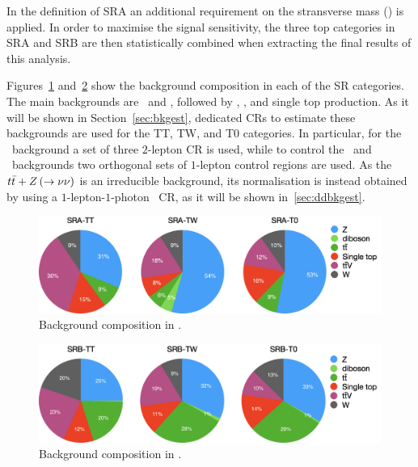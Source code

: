 				In the definition of SRA an additional requirement on the stransverse mass (\mttwo) is applied. In order to maximise the signal sensitivity, the three top categories in SRA and SRB are then statistically combined when extracting the final results of this analysis. 

				Figures~\ref{fig:SRA_bkgcomp} and~\ref{fig:SRB_bkgcomp} show the background composition in each of the SR categories. The main backgrounds are \Zjets\ and \ttV, followed by \ttbar, \Wjets, and single top production. As it will be shown in Section~\ref{sec:bkgest}, dedicated \acp{CR} to estimate these backgrounds are used for the TT, TW, and T0 categories. In particular, for the \Zjets\ background a set of three $2$-lepton \ac{CR} is used, while to control the \ttbar\ and \Wjets\ backgrounds two orthogonal sets of $1$-lepton control regions are used. As the $t\bar{t}+Z \left ( \rightarrow \nu\nu\right)$ is an irreducible background, its normalisation is instead obtained by using a $1$-lepton-$1$-photon \ttgamma\ \ac{CR}, as it will be shown in~\ref{sec:ddbkgest}.

				\begin{figure}[t]
				  \begin{center}
				   \includegraphics[width=\textwidth]{figures/stop/piechart_SRAcomp}
				   \caption{Background composition in \SRA.}
				   \label{fig:SRA_bkgcomp}
				  \end{center}
				\end{figure}


				\begin{figure}[t]
				  \begin{center}
				   \includegraphics[width=\textwidth]{figures/stop/piechart_SRBcomp}
				   \caption{Background composition in \SRB.}
				   \label{fig:SRB_bkgcomp}
				  \end{center}
				\end{figure}


